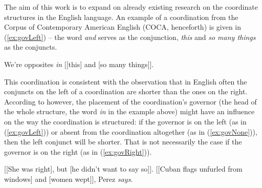 The aim of this work is to expand on already existing research on the coordinate structures in the English language. An example of a coordination from the Corpus of Contemporary American English \citep{coca} (COCA, henceforth) is given in (\ref{ex:govLeft}) -- the word \textsl{and} serves as the conjunction, \textsl{this} and \textsl{so many things} as the conjuncts.

\begin{exe}
    \ex
    \label{ex:govLeft} We're opposites \textsl{in} [[this] and [so many things]].
\end{exe}

This coordination is consistent with the observation that in English often the conjuncts on the left of a coordination are shorter than the ones on the right. According to \cite{prz:woz:23} however, the placement of the coordination's governor (the head of the whole structure, the word \textsl{in} in the example above) might have an influence on the way the coordination is structured: if the governor is on the left (as in (\ref{ex:govLeft})) or absent from the coordination altogether (as in (\ref{ex:govNone})), then the left conjunct will be shorter. That is not necessarily the case if the governor is on the right (as in (\ref{ex:govRight})).

\begin{exe}
    \ex\label{ex:govNone} [[She was right], but [he didn't want to say so]].
    \ex\label{ex:govRight} [[Cuban flags unfurled from windows] and [women wept]], Perez \textsl{says}.
\end{exe}


